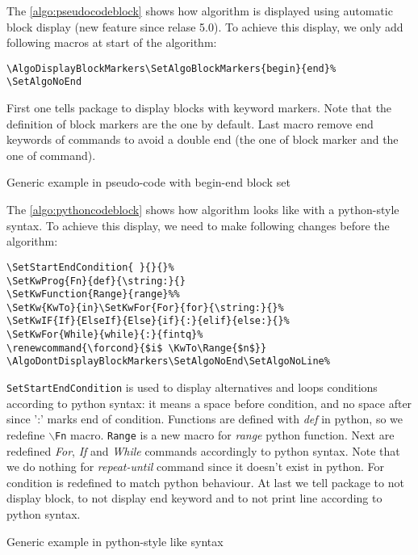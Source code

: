 \documentclass[a4paper]{article}
\begin{document}
The \autoref{algo:pseudocodeblock} shows how algorithm is displayed using automatic block
display (new feature since relase 5.0). To achieve this display, we only add following
macros at start of the algorithm:\vspace{-1.5ex}
\begin{verbatim}
\AlgoDisplayBlockMarkers\SetAlgoBlockMarkers{begin}{end}%
\SetAlgoNoEnd
\end{verbatim}
\vspace{-1.5ex}First one tells package to display blocks with keyword markers. Note that
the definition of block markers are the one by default. Last macro remove end keywords of
commands to avoid a double end (the one of block marker and the one of command).
\begin{algorithm}\AlgoDisplayBlockMarkers\SetAlgoNoEnd{}
  \caption{Generic example in pseudo-code with begin-end block set}\label{algo:pseudocodeblock}
  
\end{algorithm}\medskip

The \autoref{algo:pythoncodeblock} shows how algorithm looks like with a python-style
syntax. To achieve this display, we need to make following changes before the algorithm:\vspace{-1.5ex}
\begin{verbatim}
\SetStartEndCondition{ }{}{}%
\SetKwProg{Fn}{def}{\string:}{}
\SetKwFunction{Range}{range}%%
\SetKw{KwTo}{in}\SetKwFor{For}{for}{\string:}{}%
\SetKwIF{If}{ElseIf}{Else}{if}{:}{elif}{else:}{}%
\SetKwFor{While}{while}{:}{fintq}%
\renewcommand{\forcond}{$i$ \KwTo\Range{$n$}}
\AlgoDontDisplayBlockMarkers\SetAlgoNoEnd\SetAlgoNoLine%
\end{verbatim}
\vspace{-1.5ex}\texttt{SetStartEndCondition} is used to display alternatives and loops
conditions according to python syntax: it means a space before condition, and no space
after since ':' marks end of condition. Functions are defined with \emph{def} in python,
so we redefine \texttt{$\backslash$Fn} macro. \texttt{Range} is a new macro for
\emph{range} python function. Next are redefined \emph{For}, \emph{If} and \emph{While}
commands accordingly to python syntax. Note that we do nothing for \emph{repeat-until}
command since it doesn't exist in python. For condition is redefined to match python
behaviour. At last we tell package to not display block, to
not display end keyword and to not print line according to python syntax.%
\renewcommand{\forcond}{$i$ \KwTo\Range{$n$}}
\begin{algorithm} \AlgoDontDisplayBlockMarkers\SetAlgoNoEnd\SetAlgoNoLine%
\SetStartEndCondition{ }{}{}%
%
%
%
%
%
  \caption{Generic example in python-style like syntax}\label{algo:pythoncodeblock}
  
\end{algorithm}
\end{document}
